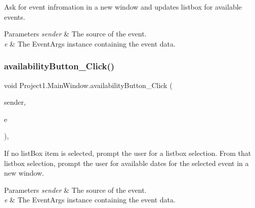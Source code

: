 Ask for event infromation in a new window and updates listbox for available events. 


\begin{DoxyParams}{Parameters}
{\em sender} & The source of the event.\\
\hline
{\em e} & The Event\+Args instance containing the event data.\\
\hline
\end{DoxyParams}
\mbox{\label{classProject1_1_1MainWindow_a70b3092e895f756ceda7a95309581fe5}} 
\subsubsection{\texorpdfstring{availability\+Button\+\_\+\+Click()}{availabilityButton\_Click()}}
{\footnotesize\ttfamily void Project1.\+Main\+Window.\+availability\+Button\+\_\+\+Click (\begin{DoxyParamCaption}\item[{object}]{sender,  }\item[{Event\+Args}]{e }\end{DoxyParamCaption})\hspace{0.3cm}{\ttfamily [inline]}, {\ttfamily [private]}}



If no list\+Box item is selected, prompt the user for a listbox selection. From that listbox selection, prompt the user for available dates for the selected event in a new window. 


\begin{DoxyParams}{Parameters}
{\em sender} & The source of the event.\\
\hline
{\em e} & The Event\+Args instance containing the event data.\\
\hline
\end{DoxyParams}
\mbox{\label{classProject1_1_1MainWindow_a9204f8ca23668b22fa23b4fa44b3ae67}} 
